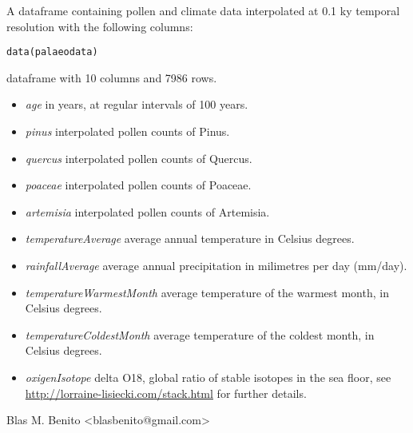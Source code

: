\documentclass[letterpaper]{book}
\begin{document}
%
\begin{Description}\relax
A dataframe containing pollen and climate data interpolated at 0.1 ky temporal resolution with the following columns:
\end{Description}
%
\begin{Usage}
\begin{verbatim}
data(palaeodata)
\end{verbatim}
\end{Usage}
%
\begin{Format}
dataframe with 10 columns and 7986 rows.
\end{Format}
%
\begin{Details}\relax
\begin{itemize}

\item \emph{age} in years, at regular intervals of 100 years.
\item \emph{pinus} interpolated pollen counts of Pinus.
\item \emph{quercus} interpolated pollen counts of Quercus.
\item \emph{poaceae} interpolated pollen counts of Poaceae.
\item \emph{artemisia} interpolated pollen counts of Artemisia.
\item \emph{temperatureAverage} average annual temperature in Celsius degrees.
\item \emph{rainfallAverage} average annual precipitation in milimetres per day (mm/day).
\item \emph{temperatureWarmestMonth} average temperature of the warmest month, in Celsius degrees.
\item \emph{temperatureColdestMonth} average temperature of the coldest month, in Celsius degrees.
\item \emph{oxigenIsotope} delta O18, global ratio of stable isotopes in the sea floor, see \url{http://lorraine-lisiecki.com/stack.html} for further details.

\end{itemize}

\end{Details}
%
\begin{Author}\relax
Blas M. Benito  <blasbenito@gmail.com>
\end{Author}
\end{document}

